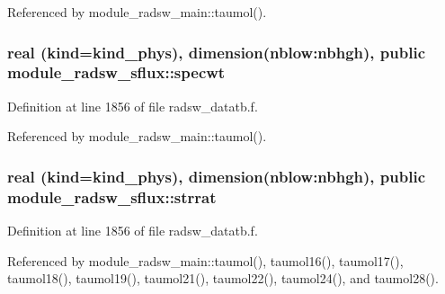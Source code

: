 Referenced by module\+\_\+radsw\+\_\+main\+::taumol().

\subsubsection[{\texorpdfstring{specwt}{specwt}}]{\setlength{\rightskip}{0pt plus 5cm}real (kind=kind\+\_\+phys), dimension(nblow\+:nbhgh), public module\+\_\+radsw\+\_\+sflux\+::specwt}\hypertarget{namespacemodule__radsw__sflux_a7d1a386e92555bcb09239ab098d8b398}{}\label{namespacemodule__radsw__sflux_a7d1a386e92555bcb09239ab098d8b398}


Definition at line 1856 of file radsw\+\_\+datatb.\+f.



Referenced by module\+\_\+radsw\+\_\+main\+::taumol().

\subsubsection[{\texorpdfstring{strrat}{strrat}}]{\setlength{\rightskip}{0pt plus 5cm}real (kind=kind\+\_\+phys), dimension(nblow\+:nbhgh), public module\+\_\+radsw\+\_\+sflux\+::strrat}\hypertarget{namespacemodule__radsw__sflux_aee2a2275da028b0960c5c1c8a34f46cf}{}\label{namespacemodule__radsw__sflux_aee2a2275da028b0960c5c1c8a34f46cf}


Definition at line 1856 of file radsw\+\_\+datatb.\+f.



Referenced by module\+\_\+radsw\+\_\+main\+::taumol(), taumol16(), taumol17(), taumol18(), taumol19(), taumol21(), taumol22(), taumol24(), and taumol28().

